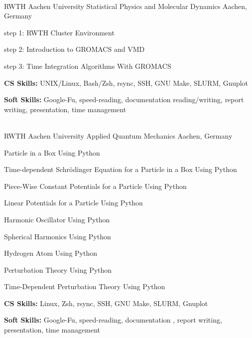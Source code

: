\begin{cventries}
{\begin{cvitems}
      \end{cvitems}
    }\\
  \cventry
    {RWTH Aachen University} %
    {Statistical Physics and Molecular Dynamics} %
    {Aachen, Germany} %
    {} %
    {
      \begin{cvitems} %
        \item {step 1: RWTH Cluster Environment}
        \item {step 2: Introduction to GROMACS and VMD}
        \item {step 3: Time Integration Algorithms With GROMACS}
        \item {\textbf{CS Skills:} UNIX/Linux, Bash/Zsh, rsync, SSH, GNU Make, SLURM, Gnuplot}
        \item {\textbf{Soft Skills:} Google-Fu, speed-reading, documentation reading/writing, report writing, presentation, time management}
      \end{cvitems}
    }\\
  \cventry
    {RWTH Aachen University} %
    {Applied Quantum Mechanics} %
    {Aachen, Germany} %
    {} %
    {
      \begin{cvitems} %
        \item {Particle in a Box Using Python}
        \item {Time-dependent Schrödinger Equation for a Particle in a Box Using Python}
        \item {Piece-Wise Constant Potentials for a Particle Using Python}
        \item {Linear Potentials for a Particle Using Python}
        \item{Harmonic Oscillator Using Python}
        \item{Spherical Harmonics Using Python}
        \item{Hydrogen Atom Using Python}
        \item{Perturbation Theory Using Python}
        \item{Time-Dependent Perturbation Theory Using Python}
        \item {\textbf{CS Skills:} Linux, Zsh, rsync, SSH, GNU Make, SLURM, Gnuplot}
        \item {\textbf{Soft Skills:} Google-Fu, speed-reading, documentation , report writing, presentation, time management}

\end{cvitems}}
\end{cventries}
